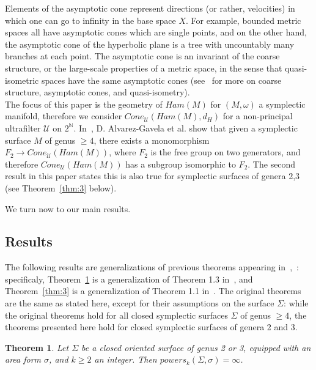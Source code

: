 \documentclass[11pt]{article}
\newtheorem{theorem}{Theorem}[section]
\newcommand{\N}{\mathbb{N}}
\begin{document}
        Elements of the asymptotic cone represent directions (or rather, velocities) in which one can go to infinity in the base space $X$. For example, bounded metric spaces all have asymptotic cones which are single points, and on the other hand, the asymptotic cone of the hyperbolic plane is a tree with uncountably many branches at each point. The asymptotic cone is an invariant of the coarse structure, or the large-scale properties of a metric space, in the sense that quasi-isometric spaces have the same asymptotic cones (see~\cite{R} for more on coarse structure, asymptotic cones, and quasi-isometry). \\
        
        The focus of this paper is the geometry of $Ham(M)$ for $(M,\omega)$ a symplectic manifold, therefore we consider $Cone_\mathcal{U}(Ham(M), d_H)$ for a non-principal ultrafilter $\mathcal{U}$ on $2^\N$. In~\cite{10}, D. Alvarez-Gavela et al. show that given a symplectic surface $M$ of genus $\geq 4$, there exists a monomorphism $F_2 \to Cone_\mathcal{U}(Ham(M))$, where $F_2$ is the free group on two generators, and therefore $Cone_\mathcal{U}(Ham(M))$ has a subgroup isomorphic to $F_2$. The second result in this paper states this is also true for symplectic surfaces of genera 2,3 (see Theorem~\ref{thm:3} below).
        
        We turn now to our main results.
    
    \subsection{Results}
    \label{sec:results}
        The following results are generalizations of previous theorems appearing in~\cite{PS14},~\cite{10}: specificaly, Theorem~\ref{thm:2} is a generalization of Theorem 1.3 in~\cite{PS14}, and Theorem~\ref{thm:3} is a generalization of Theorem 1.1 in~\cite{10}. The original theorems are the same as stated here, except for their assumptions on the surface $\Sigma$: while the original theorems hold for all closed symplectic surfaces $\Sigma$ of genus $\geq 4$, the theorems presented here hold for closed symplectic surfaces of genera 2 and 3.
        
        \begin{theorem}
        \label{thm:2}
            Let $\Sigma$ be a closed oriented surface of genus 2 or 3, equipped with an area form $\sigma$, and $k \geq 2$ an integer. Then $powers_k(\Sigma, \sigma) = \infty$.
        \end{theorem}
        
\end{document}
